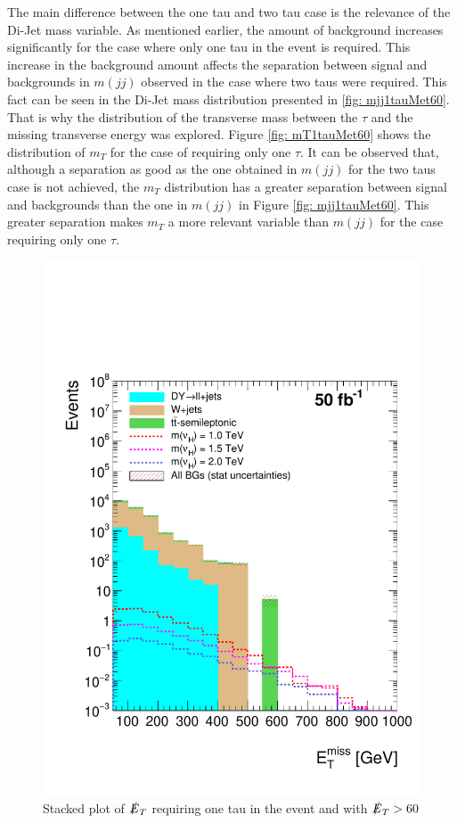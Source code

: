 The main difference between the one tau and two tau case is the relevance of the Di-Jet mass variable. As mentioned earlier, the amount of background increases significantly for the case where only one tau in the event is required. This increase in the background amount affects the separation between signal and backgrounds in $m(jj)$ observed in the case where two taus were required. This fact can be seen in the Di-Jet mass distribution presented in \ref{fig: mjj1tauMet60}. That is why the distribution of the transverse mass between the $\tau$ and the missing transverse energy was explored. Figure \ref{fig: mT1tauMet60} shows the distribution of $m_{T}$ for the case of requiring only one $\tau$. It can be observed that, although a separation as good as the one obtained in $m(jj)$ for the two taus case is not achieved, the $m_{T}$ distribution has a greater separation between signal and backgrounds than the one in $m(jj)$ in Figure \ref{fig: mjj1tauMet60}. This greater separation makes $m_{T}$ a more relevant variable than $m(jj)$ for the case requiring only one $\tau$.


\begin{figure}[htbp!]
\centering
\includegraphics[width=0.9\linewidth]{StackPlots/MET_1Tau_met60_50ifb.pdf}
\caption{Stacked plot of $\slashed{E}_{T}$ requiring one tau in the event and with $\slashed{E}_{T} > 60$}
\label{fig: MET1tauMet60}
\end{figure}

